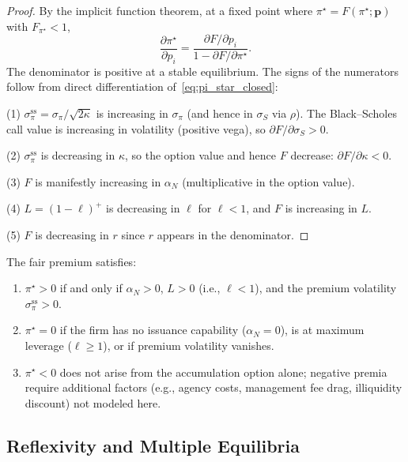 \begin{proof}
  By the implicit function theorem, at a fixed point where
  $\pi^\star = F(\pi^\star; \mathbf{p})$ with $F_{\pi^\star} < 1$,
  \[
    \frac{\partial \pi^\star}{\partial p_i}
    = \frac{\partial F / \partial p_i}{1 - \partial F / \partial \pi^\star}.
  \]
  The denominator is positive at a stable equilibrium.  The signs of the
  numerators follow from direct differentiation of~\eqref{eq:pi_star_closed}:

  (1) $\sigma_\pi^{\mathrm{ss}} = \sigma_\pi/\sqrt{2\kappa}$ is increasing in
  $\sigma_\pi$ (and hence in $\sigma_S$ via $\rho$).  The Black--Scholes call
  value is increasing in volatility (positive vega), so $\partial F/\partial
  \sigma_S > 0$.

  (2) $\sigma_\pi^{\mathrm{ss}}$ is decreasing in $\kappa$, so the option
  value and hence $F$ decrease: $\partial F/\partial\kappa < 0$.

  (3) $F$ is manifestly increasing in $\alpha_N$ (multiplicative in the option
  value).

  (4) $L = (1-\ell)^+$ is decreasing in $\ell$ for $\ell < 1$, and $F$ is
  increasing in $L$.

  (5) $F$ is decreasing in $r$ since $r$ appears in the denominator.
\end{proof}

\begin{corollary}
  \label{cor:sign_pistar}
  The fair premium satisfies:
  \begin{enumerate}
    \item $\pi^\star > 0$ if and only if
      $\alpha_N > 0$, $L > 0$ (i.e., $\ell < 1$), and the premium
      volatility $\sigma_\pi^{\mathrm{ss}} > 0$.
    \item $\pi^\star = 0$ if the firm has no issuance capability
      ($\alpha_N = 0$), is at maximum leverage ($\ell \ge 1$), or if
      premium volatility vanishes.
    \item $\pi^\star < 0$ does not arise from the accumulation option alone;
      negative premia require additional factors (e.g., agency costs,
      management fee drag, illiquidity discount) not modeled here.
  \end{enumerate}
\end{corollary}

\subsection{Reflexivity and Multiple Equilibria}
\label{sec:multiple_equilibria}

